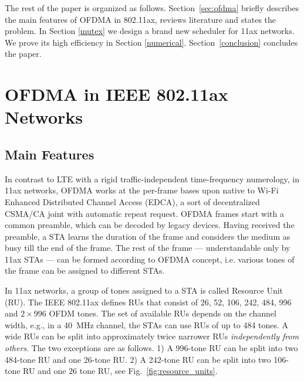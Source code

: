 The rest of the paper is organized as follows.
Section~\ref{sec:ofdma} briefly describes the main features of OFDMA in 802.11ax, reviews literature and states the problem.
In Section \ref{mutex} we design a brand new scheduler for 11ax networks.
We prove its high efficiency in Section \ref{numerical}.
Section~\ref{conclusion} concludes the paper. 



\section{OFDMA in IEEE 802.11ax Networks}
\subsection{Main Features}




In contrast to LTE with a rigid traffic-independent time-frequency numerology, in 11ax networks, OFDMA works at the per-frame bases upon native to Wi-Fi Enhanced Distributed Channel Access (EDCA), a sort of decentralized CSMA/CA joint with automatic repeat request. OFDMA frames start with a common preamble, which can be decoded by legacy devices. Having received the preamble, a STA learns the duration of the frame and considers the medium as busy till the end of the frame.
The rest of the frame --- understandable only by 11ax STAs --- can be formed according to OFDMA concept, i.e. various tones of the frame can be assigned to different STAs. 

In 11ax networks, a group of tones assigned to a STA is called Resource Unit (RU).
The IEEE 802.11ax defines RUs that consist of 26, 52, 106, 242, 484, 996 and $2\times996$ OFDM tones.
The set of available RUs depends on the channel width, e.g., in a \SI{40}{\MHz} channel, the STAs can use RUs of up to 484 tones.
A wide RUs can be split into approximately twice narrower RUs \textit{independently from others}. The two exceptions are as follows.
1) A 996-tone RU can be split into two 484-tone RU and one 26-tone RU.
2) A 242-tone RU can be split into two 106-tone RU and one 26 tone RU, see Fig.~\ref{fig:resource_units}.

